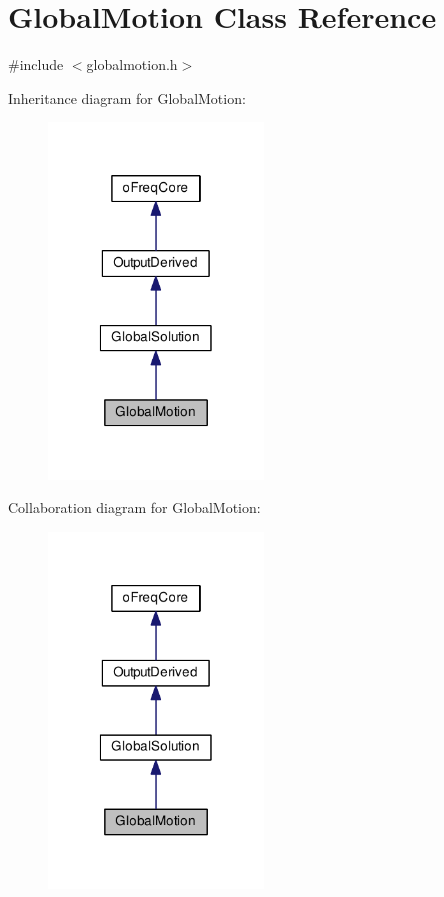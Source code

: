 \hypertarget{class_global_motion}{\section{Global\-Motion Class Reference}
\label{class_global_motion}
}


{\ttfamily \#include $<$globalmotion.\-h$>$}



Inheritance diagram for Global\-Motion\-:
\nopagebreak
\begin{figure}[H]
\begin{center}
\leavevmode
\includegraphics[width=162pt]{class_global_motion__inherit__graph}
\end{center}
\end{figure}


Collaboration diagram for Global\-Motion\-:
\nopagebreak
\begin{figure}[H]
\begin{center}
\leavevmode
\includegraphics[width=162pt]{class_global_motion__coll__graph}
\end{center}
\end{figure}
